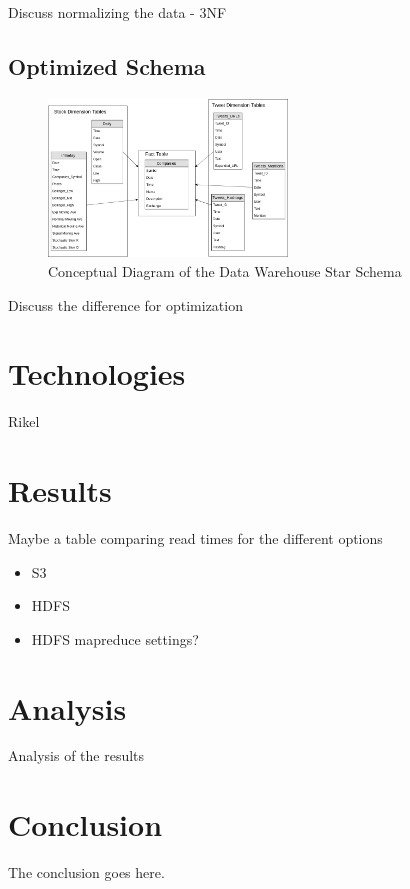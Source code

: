 \documentclass[journal]{IEEEtran}
\begin{document}
Discuss normalizing the data - 3NF

\subsection{Optimized Schema}

\begin{figure}
	\centering
	\includegraphics[width=2.5in]{Star_Conceptual_Schema.png}
	\caption{Conceptual Diagram of the Data Warehouse Star Schema}
	\label{star}
\end{figure}

Discuss the difference for optimization

\section{Technologies}

Rikel

\section{Results}



Maybe a table comparing read times for the different options

\begin{itemize}
	\item S3
	\item HDFS
	\item HDFS mapreduce settings?
\end{itemize}

\section{Analysis}

Analysis of the results


\section{Conclusion}

The conclusion goes here.
\end{document}
